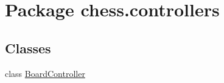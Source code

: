 \hypertarget{namespacechess_1_1controllers}{}\section{Package chess.\+controllers}
\label{namespacechess_1_1controllers}
\subsection*{Classes}
\begin{DoxyCompactItemize}
\item 
class \mbox{\hyperlink{classchess_1_1controllers_1_1_board_controller}{Board\+Controller}}
\end{DoxyCompactItemize}
